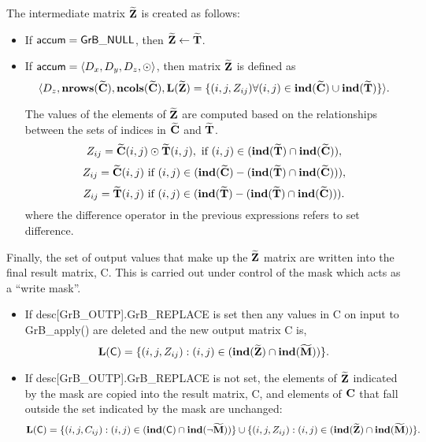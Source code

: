 The intermediate matrix ${\bf \widetilde{Z}}$ is created as follows:
\begin{itemize}
    \item If ${\sf accum} = {\sf GrB\_NULL}$, then ${\bf \widetilde{Z}} \leftarrow {\bf \widetilde{T}}$.

    \item If ${\sf accum} = \langle D_x, D_y, D_z, \odot \rangle$, then matrix ${\bf \widetilde{Z}}$ is defined as 
        \[ \langle D_z, \bold{nrows}({\bf \widetilde{C}}), \bold{ncols}({\bf \widetilde{C}}),
        \bold{L}({\bf \widetilde{Z}}) 
		= \{(i,j,Z_{ij})  \forall (i,j) \in \bold{ind}({\bf \widetilde{C}}) \cup 
        \bold{ind}({\bf \widetilde{T}}) \} \rangle. \]

        The values of the elements of ${\bf \widetilde{Z}}$ are computed based on the 
        relationships between the sets of indices in ${\bf \widetilde{C}}$ and 
        ${\bf \widetilde{T}}$.
\[
Z_{ij} = {\bf \widetilde{C}}(i,j) \odot {\bf \widetilde{T}}(i,j), \ \mbox{if}\  (i,j) \in  (\bold{ind}({\bf \widetilde{T}}) \cap \bold{ind}({\bf \widetilde{C}})),
\]
\[
Z_{ij} = \matrix{\widetilde{C}}(i,j) \ \mbox{if}\  (i,j) \in  (\bold{ind}(\matrix{\widetilde{C}}) - (\bold{ind}(\matrix{\widetilde{T}}) \cap \bold{ind}(\matrix{\widetilde{C}}))),
\]
\[
Z_{ij} = \matrix{\widetilde{T}}(i,j) \ \mbox{if}\  (i,j) \in  (\bold{ind}(\matrix{\widetilde{T}}) - (\bold{ind}(\matrix{\widetilde{T}}) \cap \bold{ind}(\matrix{\widetilde{C}}))).
\]
where the difference operator in the previous expressions refers to set difference.
\end{itemize}

Finally, the set of output values that make up the ${\bf \widetilde{Z}}$ 
matrix are written into the final result matrix, {\sf C}. 
This is carried out under control of the mask which acts as a ``write mask''.
\begin{itemize}
\item If {\sf desc[GrB\_OUTP].GrB\_REPLACE} is set then any values in {\sf C} 
on input to {\sf GrB\_apply()} are deleted and the new output matrix {\sf C} is,
\[ \bold{L}({\sf C}) = \{(i,j,Z_{ij}) : (i,j) \in (\bold{ind}({\bf \widetilde{Z}}) 
\cap \bold{ind}({\bf \widetilde{M}})) \}. \]

\item If {\sf desc[GrB\_OUTP].GrB\_REPLACE} is not set, the elements of 
${\bf \widetilde{Z}}$ indicated by 
the mask are copied into the result matrix, {\sf C}, and elements of 
${\bf C}$ that fall outside the set indicated by the mask are unchanged:
\[ \bold{L}({\sf C}) = \{(i,j,C_{ij}) : (i, j) \in (\bold{ind}({\sf C}) 
\cap \bold{ind}(\neg {\bf \widetilde{M}})) \} \cup \{(i,j,Z_{ij}) : (i,j) \in 
(\bold{ind}({\bf \widetilde{Z}}) \cap \bold{ind}({\bf \widetilde{M}})) \}. \]
\end{itemize}

